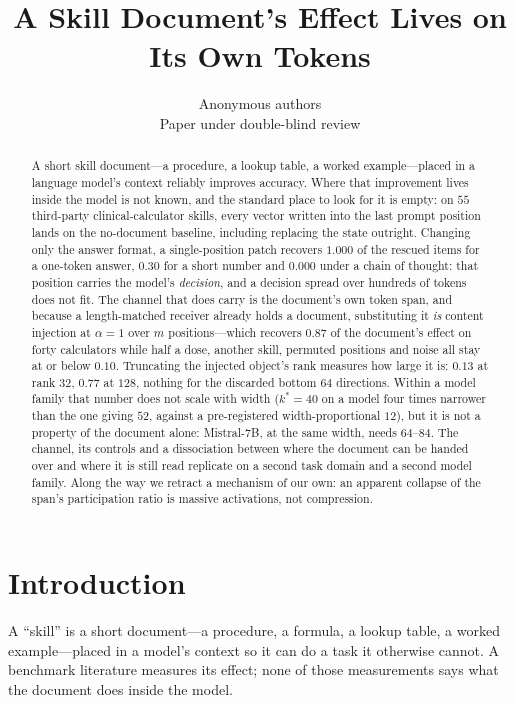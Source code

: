 \documentclass{article}
\title{A Skill Document's Effect Lives on Its Own Tokens}
\author{Anonymous authors \\
Paper under double-blind review}
\begin{document}
\maketitle

\begin{abstract}
A short skill document---a procedure, a lookup table, a worked example---placed
in a language model's context reliably improves accuracy. Where that improvement
lives inside the model is not known, and the standard place to look for it is
empty: on $55$ third-party clinical-calculator skills, every vector written into
the last prompt position lands on the no-document baseline, including replacing
the state outright. Changing only the answer format, a single-position patch
recovers $1.000$ of the rescued items for a one-token answer, $0.30$ for a short
number and $\mathbf{0.000}$ under a chain of thought: that position carries the
model's \emph{decision}, and a decision spread over hundreds of tokens does not
fit. The channel that does carry is the document's own token span, and because a
length-matched receiver already holds a document, substituting it \emph{is}
content injection at $\alpha=1$ over $m$ positions---which recovers $0.87$ of
the document's effect on forty calculators while half a dose, another skill,
permuted positions and noise all stay at or below $0.10$. Truncating the injected
object's rank measures how large it is: $0.13$ at rank $32$, $0.77$ at $128$,
nothing for the discarded bottom $64$ directions. Within a model family that
number does not scale with width ($k^{*}=40$ on a model four times narrower
than the one giving $52$, against a pre-registered width-proportional $12$), but
it is not a property of the document alone: Mistral-7B, at the same width, needs
$64$--$84$. The channel, its controls and a dissociation between where the
document can be handed over and where it is still read replicate on a second
task domain and a second model family. Along the way we retract a mechanism of
our own: an apparent collapse of the span's participation ratio is massive
activations, not compression.
\end{abstract}

\section{Introduction}

A ``skill'' is a short document---a procedure, a formula, a lookup table, a
worked example---placed in a model's context so it can do a task it otherwise
cannot. A benchmark literature measures its effect; none of those measurements
says what the document does inside the model.
\end{document}
